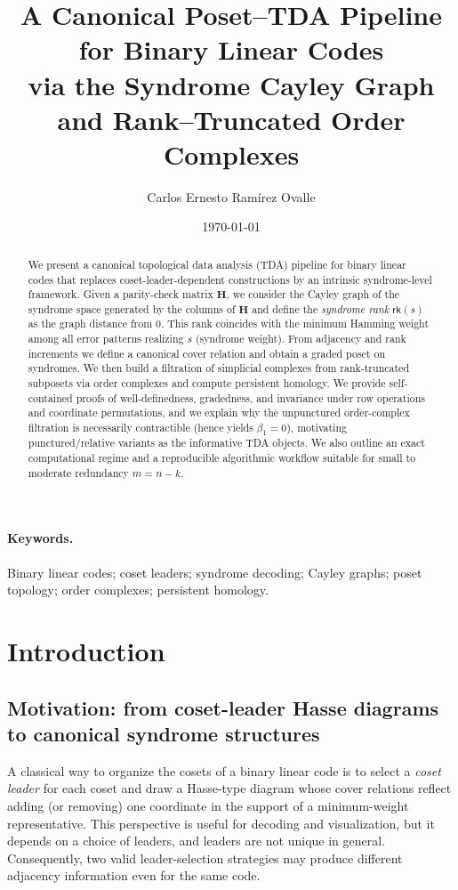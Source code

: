 \documentclass[11pt,twoside,leqno]{article}
\title{A Canonical Poset--TDA Pipeline for Binary Linear Codes\\
via the Syndrome Cayley Graph and Rank--Truncated Order Complexes}
\author{Carlos Ernesto Ram\'irez Ovalle}
\date{\today}
\theoremstyle{definition}
\theoremstyle{plain}
\theoremstyle{remark}
\newcommand{\rk}{\mathsf{rk}}
\newcommand{\HH}{\mathbf{H}}
\begin{document}
\maketitle

\begin{abstract}
We present a canonical topological data analysis (TDA) pipeline for binary linear codes that replaces
coset-leader-dependent constructions by an intrinsic syndrome-level framework. Given a parity-check matrix
$\HH$, we consider the Cayley graph of the syndrome space generated by the columns of $\HH$ and define the
\emph{syndrome rank} $\rk(s)$ as the graph distance from $0$. This rank coincides with the minimum Hamming
weight among all error patterns realizing $s$ (syndrome weight). From adjacency and rank increments we define a
canonical cover relation and obtain a graded poset on syndromes. We then build a filtration of simplicial complexes
from rank-truncated subposets via order complexes and compute persistent homology. We provide self-contained proofs
of well-definedness, gradedness, and invariance under row operations and coordinate permutations, and we explain
why the unpunctured order-complex filtration is necessarily contractible (hence yields $\beta_1=0$), motivating
punctured/relative variants as the informative TDA objects. We also outline an exact computational regime and a
reproducible algorithmic workflow suitable for small to moderate redundancy $m=n-k$.
\end{abstract}

\paragraph{Keywords.}
Binary linear codes; coset leaders; syndrome decoding; Cayley graphs; poset topology; order complexes; persistent homology.



\section{Introduction}\label{sec:introduction}

\subsection{Motivation: from coset-leader Hasse diagrams to canonical syndrome structures}
A classical way to organize the cosets of a binary linear code is to select a \emph{coset leader} for each coset
and draw a Hasse-type diagram whose cover relations reflect adding (or removing) one coordinate in the support of
a minimum-weight representative. This perspective is useful for decoding and visualization, but it depends on a
choice of leaders, and leaders are not unique in general. Consequently, two valid leader-selection strategies may
produce different adjacency information even for the same code.
\end{document}
